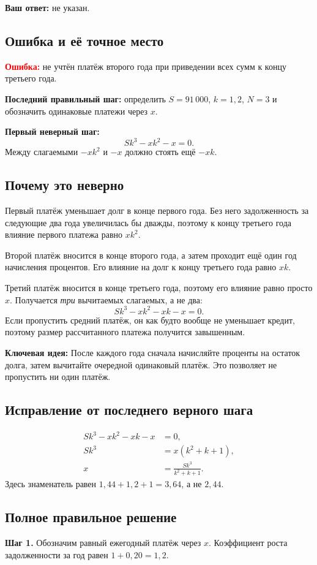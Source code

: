 \documentclass[12pt,a4paper]{article}
\newcommand{\Err}{\textcolor{red}{\textbf{Ошибка:}}}
\newcommand{\Idea}{\textcolor{blue!60!black}{\textbf{Ключевая идея:}}}
\begin{document}
\textbf{Ваш ответ:} не указан.

\subsection*{Ошибка и её точное место}
\Err{} не учтён платёж второго года при приведении всех сумм к концу третьего года.

\textbf{Последний правильный шаг:} определить $S=91\,000$, $k=1{,}2$, $N=3$ и обозначить одинаковые платежи через $x$.

\textbf{Первый неверный шаг:}
\[
Sk^3-xk^2-x=0.
\]
Между слагаемыми $-xk^2$ и $-x$ должно стоять ещё $-xk$.

\subsection*{Почему это неверно}
Первый платёж уменьшает долг в конце первого года. Без него задолженность за следующие два года увеличилась бы дважды, поэтому к концу третьего года влияние первого платежа равно $xk^2$.

Второй платёж вносится в конце второго года, а затем проходит ещё один год начисления процентов. Его влияние на долг к концу третьего года равно $xk$.

Третий платёж вносится в конце третьего года, поэтому его влияние равно просто $x$. Получается \emph{три} вычитаемых слагаемых, а не два:
\[
Sk^3-xk^2-xk-x=0.
\]
Если пропустить средний платёж, он как будто вообще не уменьшает кредит, поэтому размер рассчитанного платежа получится завышенным.

\Idea{} После каждого года сначала начисляйте проценты на остаток долга, затем вычитайте очередной одинаковый платёж. Это позволяет не пропустить ни один платёж.

\subsection*{Исправление от последнего верного шага}
\[
\begin{aligned}
Sk^3-xk^2-xk-x&=0,\\
Sk^3&=x(k^2+k+1),\\
x&=\frac{Sk^3}{k^2+k+1}.
\end{aligned}
\]
Здесь знаменатель равен $1{,}44+1{,}2+1=3{,}64$, а не $2{,}44$.

\subsection*{Полное правильное решение}
\textbf{Шаг 1.} Обозначим равный ежегодный платёж через $x$. Коэффициент роста задолженности за год равен $1+0{,}20=1{,}2$.
\end{document}
